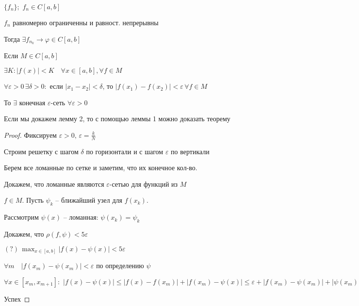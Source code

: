 
\begin{theorem}\thmslashn 
	
	$\{f_n\}; \,\,f_n \in C[a, b]$
	
	$f_n$ равномерно ограниченны и равност. непрерывны
	
	Тогда $\exists f_{n_k} \to \varphi \in C[a, b]$ 
	
\end{theorem}

\begin{lemma}[2]\thmslashn
	
	Если $M \in C[a, b]$
	
	$\exists K: |f(x)| < K\quad \forall x \in [a, b], \forall f \in M$
	
	$\forall \varepsilon > 0\, \exists \delta > 0:$ если $|x_ 1 - x_2| < \delta$, то $|f(x_1) - f(x_2)| < \varepsilon\,\forall f \in M$
	
	То $\exists$ конечная $\varepsilon$-сеть $\forall \varepsilon > 0$
	
\end{lemma}

\begin{remark}\thmslashn

	Если мы докажем лемму 2, то с помощью леммы 1 можно доказать теорему

\end{remark}

\begin{proof}\thmslashn
	
	Фиксируем $\varepsilon > 0, \, \varepsilon = \frac{k}{N}$
	
	Строим решетку с шагом $\delta$ по горизонтали и с шагом $\varepsilon$ по вертикали
	
	Берем все ломанные по сетке и заметим, что их конечное кол-во. 
	
	Докажем, что ломанные являются $\varepsilon$-сетью для функций из $M$ 
	
	$f \in M$. Пусть $\psi_k$ -- ближайший узел для $f(x_k)$.
	
	Рассмотрим $\psi(x)$ -- ломанная: $\psi(x_k) = \psi_k$
	
	Докажем, что $\rho(f, \psi) < 5\varepsilon$
	
	$(?)\, \max_{x\in[a, b]}|f(x) - \psi(x)| < 5\varepsilon$
	
	$\forall m \quad |f(x_m) - \psi(x_m)| < \varepsilon$ по определению $\psi$
	
	$\forall x \in [x_m, x_{m+1}]:\,\, |f(x) - \psi(x)| \leqslant |f(x) - f(x_m)| + |f(x_m) - \psi(x)| \leqslant \varepsilon + |f(x_m) - \psi(x_m)| + |\psi(x_m) - \psi(x)| \leqslant 2\varepsilon + |\psi(x_m) - \psi(x_{m+1})| \leqslant 2\varepsilon + |\psi(x_m) - f(x_m)| + |f(x_m) - f(x_{m+1})| + |f(x_{m+1}) - \psi(x_{m+1})| \leqslant 5\varepsilon$
	
	Успех

\end{proof}


